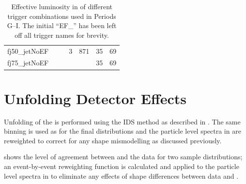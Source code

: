 \begin{table}
\begin{center}
\begin{tabular}{ r r@{.}l r@{.}l r@{.}l r@{.}l }
    fj50\_jetNoEF  & \multicolumn{2}{l}{}               & \multicolumn{2}{l}{}              & 3&871                             & 35&69                             \\
    fj75\_jetNoEF  & \multicolumn{2}{l}{}               & \multicolumn{2}{l}{}              & \multicolumn{2}{l}{}              & 35&69                             \\
  \end{tabular}
  \caption{Effective luminosity in \ipb of different trigger combinations used in
           Periods G--I. The initial ``EF\_'' has been left off all trigger names
           for brevity.}
  \label{tab:dijets:LumiDijetPeriodGI}
\end{center}
\end{table}

\section{Unfolding Detector Effects}
Unfolding of the \dijet {} is performed using the IDS method as described
in . The same binning is used as for
the final distributions and the particle level spectra in \MC are reweighted to
correct for any shape mismodelling as discussed previously.

 shows the level of agreement
between \Pythia and the data for two sample distributions; an event-by-event reweighting
function is calculated and applied to the particle level spectra in \MC to eliminate
any effects of shape differences between data and \MC.

